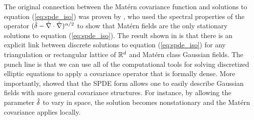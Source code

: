 The original connection between the Mat\'ern covariance function and solutions
to equation (\ref{eq:spde_iso}) was proven by
\cite{whittle_stationary_1954,whittle1963stochastic}, who
used the spectral properties of the operator $(\hat{\delta} -
\hat{\nabla}\cdot\hat{\nabla})^{\alpha/2}$ to show that Mat\'ern fields are the only
stationary solutions to equation (\ref{eq:spde_iso}).
The result shown in \citet{RSSB:RSSB777} is
that there is an explicit link between discrete solutions to equation
(\ref{eq:spde_iso}) for any triangulation or rectangular lattice of $\mathbb{R}^{d}$
and Mat\'ern class Gaussian fields.
The punch line is that we can use all of the computational tools for solving discretized
elliptic equations to apply a covariance operator that is formally dense.
More importantly, \citet{RSSB:RSSB777} showed that the SPDE form allows
one to easily describe Gaussian fields with more general covariance structures.
For instance, by allowing the parameter $\hat{\delta}$ to vary in space, the solution
becomes nonstationary and the Mat\'ern covariance applies locally.

